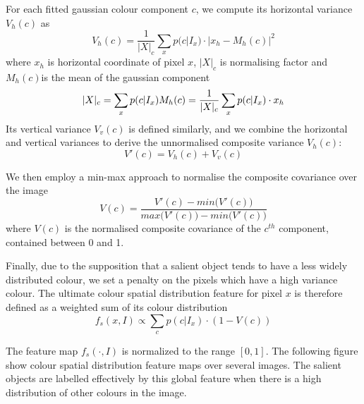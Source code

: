 \documentclass[10pt,twocolumn,letterpaper]{article}
\newcommand{\SUM}{\sum\limits}
\begin{document}
For each fitted gaussian colour component $c$, we compute its horizontal variance $V_{h}(c)$ as $$V_{h}(c) = \frac{1}{|X|_{c}} \sum_{x} p (c|I_{x}) \cdot | x_{h} - M_{h}(c) |^{2}$$where $x_h$ is horizontal coordinate of pixel $x$, $|X|_c$ is normalising factor and $M_h (c)$is the mean of the gaussian component$$|X|_c = \sum_x p(c|I_x)\\M_h (c) = \frac{1}{|X|_c} \sum_{x} p(c|I_x) \cdot x_h$$Its vertical variance $V_{v}(c)$ is defined similarly, and we combine the horizontal and vertical variances to derive the unnormalised composite variance $V_h (c)$:$$V' (c) = V_h (c) + V_v (c) $$

We then employ a min-max approach to normalise the composite covariance over the image$$V (c) = \frac{V'(c) - min \big(V'(c)\big) }{max \big(V'(c)\big) - min \big(V'(c)\big)}$$where $V(c)$ is the normalised composite covariance of the $c^{th}$ component, contained between 0 and 1.

Finally, due to the supposition that a salient object tends to have a less widely distributed colour, we set a penalty on the pixels which have a high variance colour. The ultimate colour spatial distribution feature for pixel $x$ is therefore defined as a weighted sum of its colour distribution $$f_s(x,I)\propto\SUM_c p(c|I_x)\cdot(1-V(c))$$

The feature map $f_s (\cdot,I)$ is normalized to the range $[0, 1]$. The following figure show colour spatial distribution feature maps over several images. The salient objects are labelled effectively by this global feature when there is a high distribution of other colours in the image.
\end{document}
